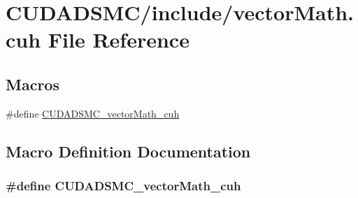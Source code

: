 \hypertarget{vector_math_8cuh}{\section{C\+U\+D\+A\+D\+S\+M\+C/include/vector\+Math.cuh File Reference}
\label{vector_math_8cuh}
}
\subsection*{Macros}
\begin{DoxyCompactItemize}
\item 
\#define \hyperlink{vector_math_8cuh_a29339028b271fa1c35feeadc43cb238a}{C\+U\+D\+A\+D\+S\+M\+C\+\_\+vector\+Math\+\_\+cuh}
\end{DoxyCompactItemize}


\subsection{Macro Definition Documentation}
\hypertarget{vector_math_8cuh_a29339028b271fa1c35feeadc43cb238a}{
\subsubsection[{C\+U\+D\+A\+D\+S\+M\+C\+\_\+vector\+Math\+\_\+cuh}]{\setlength{\rightskip}{0pt plus 5cm}\#define C\+U\+D\+A\+D\+S\+M\+C\+\_\+vector\+Math\+\_\+cuh}}\label{vector_math_8cuh_a29339028b271fa1c35feeadc43cb238a}
